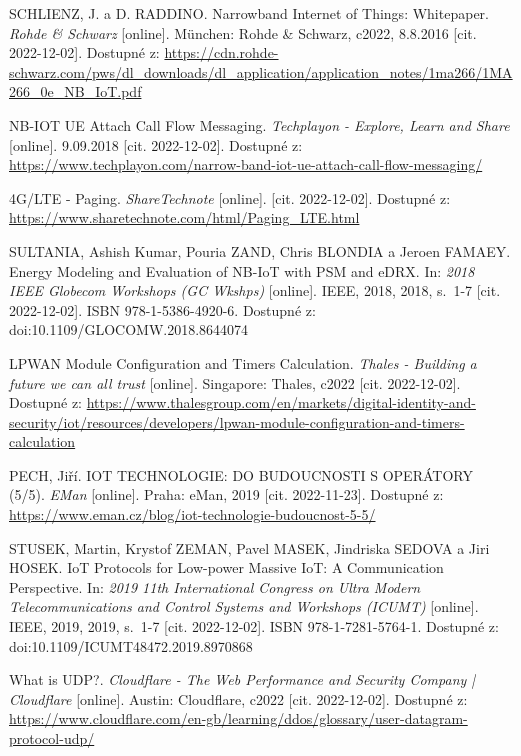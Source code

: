 \begin{thebibliography}{99}
SCHLIENZ, J. a D. RADDINO. Narrowband Internet of Things: Whitepaper. \textit{Rohde \& Schwarz} [online]. München: Rohde \& Schwarz, c2022, 8.8.2016 [cit. 2022-12-02]. Dostupné z: \url{https://cdn.rohde-schwarz.com/pws/dl\_downloads/dl\_application/application\_notes/1ma266/1MA266\_0e\_NB\_IoT.pdf}

NB-IOT UE Attach Call Flow Messaging. \textit{Techplayon - Explore, Learn and Share} [online]. 9.09.2018 [cit. 2022-12-02]. Dostupné z: \url{https://www.techplayon.com/narrow-band-iot-ue-attach-call-flow-messaging/}

4G/LTE - Paging. \textit{ShareTechnote} [online]. [cit. 2022-12-02]. Dostupné z: \url{https://www.sharetechnote.com/html/Paging\_LTE.html}

SULTANIA, Ashish Kumar, Pouria ZAND, Chris BLONDIA a Jeroen FAMAEY. Energy Modeling and Evaluation of NB-IoT with PSM and eDRX. In: \textit{2018 IEEE Globecom Workshops (GC Wkshps)} [online]. IEEE, 2018, 2018, s.~1-7 [cit. 2022-12-02]. ISBN 978-1-5386-4920-6. Dostupné z: doi:10.1109/GLOCOMW.2018.8644074

LPWAN Module Configuration and Timers Calculation. \textit{Thales - Building a future we can all trust} [online]. Singapore: Thales, c2022 [cit. 2022-12-02]. Dostupné z: \url{https://www.thalesgroup.com/en/markets/digital-identity-and-security/iot/resources/developers/lpwan-module-configuration-and-timers-calculation}

PECH, Jiří. IOT TECHNOLOGIE: DO BUDOUCNOSTI S OPERÁTORY (5/5). \textit{EMan} [online]. Praha: eMan, 2019 [cit. 2022-11-23]. Dostupné z: \url{https://www.eman.cz/blog/iot-technologie-budoucnost-5-5/}

STUSEK, Martin, Krystof ZEMAN, Pavel MASEK, Jindriska SEDOVA a Jiri HOSEK. IoT Protocols for Low-power Massive IoT: A Communication Perspective. In: \textit{2019 11th International Congress on Ultra Modern Telecommunications and Control Systems and Workshops (ICUMT)} [online]. IEEE, 2019, 2019, s.~1-7 [cit. 2022-12-02]. ISBN 978-1-7281-5764-1. Dostupné z: doi:10.1109/ICUMT48472.2019.8970868

What is UDP?. \textit{Cloudflare - The Web Performance and Security Company | Cloudflare} [online]. Austin: Cloudflare, c2022 [cit. 2022-12-02]. Dostupné z: \url{https://www.cloudflare.com/en-gb/learning/ddos/glossary/user-datagram-protocol-udp/}


\end{thebibliography}
